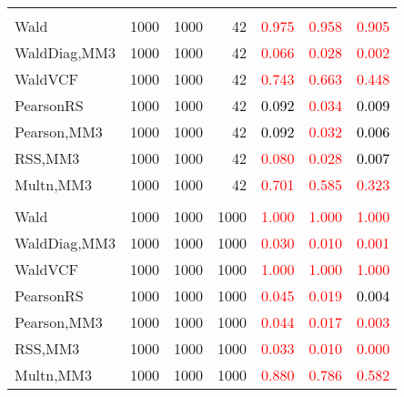 \documentclass[
]{article}
\begin{document}
\begin{table}[H]
{\begin{tabular}[t]{lrrrrrr}
\addlinespace[0.3em]
\multicolumn{7}{l}{\textbf{2F 10V}}\\
\hspace{1em}Wald & 1000 & 1000 & 42 & \textcolor{red}{0.975} & \textcolor{red}{0.958} & \textcolor{red}{0.905}\\
\hspace{1em}WaldDiag,MM3 & 1000 & 1000 & 42 & \textcolor{red}{0.066} & \textcolor{red}{0.028} & \textcolor{red}{0.002}\\
\hspace{1em}WaldVCF & 1000 & 1000 & 42 & \textcolor{red}{0.743} & \textcolor{red}{0.663} & \textcolor{red}{0.448}\\
\hspace{1em}PearsonRS & 1000 & 1000 & 42 & \textcolor{black}{0.092} & \textcolor{red}{0.034} & \textcolor{black}{0.009}\\
\hspace{1em}Pearson,MM3 & 1000 & 1000 & 42 & \textcolor{black}{0.092} & \textcolor{red}{0.032} & \textcolor{black}{0.006}\\
\hspace{1em}RSS,MM3 & 1000 & 1000 & 42 & \textcolor{red}{0.080} & \textcolor{red}{0.028} & \textcolor{black}{0.007}\\
\hspace{1em}Multn,MM3 & 1000 & 1000 & 42 & \textcolor{red}{0.701} & \textcolor{red}{0.585} & \textcolor{red}{0.323}\\
\addlinespace[0.3em]
\multicolumn{7}{l}{\textbf{3F 15V}}\\
\hspace{1em}Wald & 1000 & 1000 & 1000 & \textcolor{red}{1.000} & \textcolor{red}{1.000} & \textcolor{red}{1.000}\\
\hspace{1em}WaldDiag,MM3 & 1000 & 1000 & 1000 & \textcolor{red}{0.030} & \textcolor{red}{0.010} & \textcolor{red}{0.001}\\
\hspace{1em}WaldVCF & 1000 & 1000 & 1000 & \textcolor{red}{1.000} & \textcolor{red}{1.000} & \textcolor{red}{1.000}\\
\hspace{1em}PearsonRS & 1000 & 1000 & 1000 & \textcolor{red}{0.045} & \textcolor{red}{0.019} & \textcolor{black}{0.004}\\
\hspace{1em}Pearson,MM3 & 1000 & 1000 & 1000 & \textcolor{red}{0.044} & \textcolor{red}{0.017} & \textcolor{red}{0.003}\\
\hspace{1em}RSS,MM3 & 1000 & 1000 & 1000 & \textcolor{red}{0.033} & \textcolor{red}{0.010} & \textcolor{red}{0.000}\\
\hspace{1em}Multn,MM3 & 1000 & 1000 & 1000 & \textcolor{red}{0.880} & \textcolor{red}{0.786} & \textcolor{red}{0.582}\\
\bottomrule
\end{tabular}}
\endgroup{}
\end{table}
\end{document}
